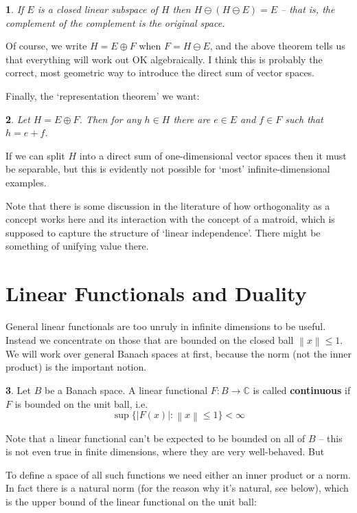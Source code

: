 \documentclass[oneside,english]{amsbook}
\numberwithin{section}{chapter}
\theoremstyle{plain}
\newtheorem{thm}{\protect\theoremname}
\theoremstyle{definition}
\newtheorem{defn}[thm]{\protect\definitionname}
\newcommand{\norm}[1]{\left\lVert#1\right\rVert}
\providecommand{\definitionname}{Definition}
\providecommand{\theoremname}{Theorem}
\begin{document}
\begin{thm}
	If $E$ is a closed linear subspace of $H$ then $H\ominus (H\ominus E) = E$ -- that is, the complement of the complement is the original space.
\end{thm}

Of course, we write $H = E\oplus F$ when $F = H\ominus E$, and the above theorem tells us that everything will work out OK algebraically. I think this is probably the correct, most geometric way to introduce the direct sum of vector spaces.

Finally, the `representation theorem' we want:

\begin{thm}
	Let $H = E\oplus F$. Then for any $h\in H$ there are $e\in E$ and $f\in F$ such that $h = e + f$.
\end{thm}

If we can split $H$ into a direct sum of one-dimensional vector spaces then it must be separable, but this is evidently not possible for `most' infinite-dimensional examples.

Note that there is some discussion in the literature of how orthogonality as a concept works here and its interaction with the concept of a matroid, which is supposed to capture the structure of `linear independence'. There might be something of unifying value there.

\section{Linear Functionals and Duality}

General linear functionals are too unruly in infinite dimensions to be useful. Instead we concentrate on those that are bounded on the closed ball $\norm{x}\le 1$. We will work over general Banach spaces at first, because the norm (not the inner product) is the important notion.

\begin{defn}
	Let $B$ be a Banach space. A linear functional $F:B\to \mathbb{C}$ is called \textbf{continuous} if $F$ is bounded on the unit ball, i.e.
	\[
		\sup\{|F(x)| : \norm{x}\le 1\} < \infty
	\]
\end{defn}

Note that a linear functional can't be expected to be bounded on all of $B$ -- this is not even true in finite dimensions, where they are very well-behaved. But 

To define a space of all such functions we need either an inner product or a norm. In fact there is a natural norm (for the reason why it's natural, see below), which is the upper bound of the linear functional on the unit ball:
\end{document}
